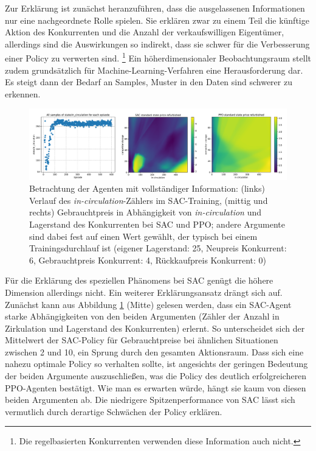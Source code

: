 Zur Erklärung ist zunächst heranzuführen, dass die ausgelassenen Informationen nur eine nachgeordnete Rolle spielen.
Sie erklären zwar zu einem Teil die künftige Aktion des Konkurrenten und die Anzahl der verkaufswilligen Eigentümer, allerdings sind die Auswirkungen so indirekt, dass sie schwer für die Verbesserung einer Policy zu verwerten sind. \footnote{Die regelbasierten Konkurrenten verwenden diese Information auch nicht.}
Ein höherdimensionaler Beobachtungsraum stellt zudem grundsätzlich für Machine-Learning-Verfahren eine Herausforderung dar.
Es steigt dann der Bedarf an Samples, Muster in den Daten sind schwerer zu erkennen.

\begin{figure}[htb]
	\centering
	\includegraphics[width=\textwidth]{main/sac_in_circulation_dependend_explanation.pdf}
	\caption{Betrachtung der Agenten mit vollständiger Information: (links) Verlauf des \textit{in-circulation}-Zählers im SAC-Training, (mittig und rechts) Gebrauchtpreis in Abhängigkeit von \textit{in-circulation} und Lagerstand des Konkurrenten bei SAC und PPO; andere Argumente sind dabei fest auf einen Wert gewählt, der typisch bei einem Trainingsdurchlauf ist (eigener Lagerstand: 25, Neupreis Konkurrent: 6, Gebrauchtpreis Konkurrent: 4, Rückkaufpreis Konkurrent: 0)}
	\label{graphic:InCirculationExplain}
\end{figure}
Für die Erklärung des speziellen Phänomens bei SAC genügt die höhere Dimension allerdings nicht.
Ein weiterer Erklärungsansatz drängt sich auf.
Zunächst kann aus Abbildung \ref{graphic:InCirculationExplain} (Mitte) gelesen werden, dass ein SAC-Agent starke Abhängigkeiten von den beiden Argumenten (Zähler der Anzahl in Zirkulation und Lagerstand des Konkurrenten) erlernt.
So unterscheidet sich der Mittelwert der SAC-Policy für Gebrauchtpreise bei ähnlichen Situationen zwischen 2 und 10, ein Sprung durch den gesamten Aktionsraum.
Dass sich eine nahezu optimale Policy so verhalten sollte, ist angesichts der geringen Bedeutung der beiden Argumente auszuschließen, was die Policy des deutlich erfolgreicheren PPO-Agenten bestätigt.
Wie man es erwarten würde, hängt sie kaum von diesen beiden Argumenten ab.
Die niedrigere Spitzenperformance von SAC lässt sich vermutlich durch derartige Schwächen der Policy erklären.

